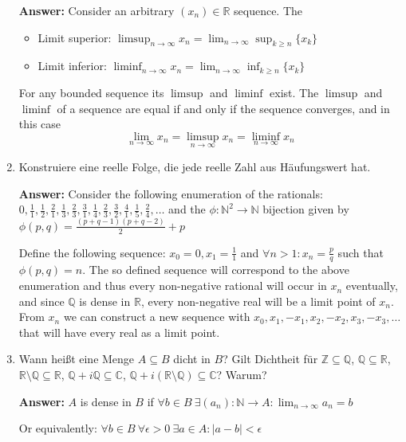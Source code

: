 \documentclass[11pt]{article}
\newcommand{\abs}[1]{\left|#1\right|}
\newcommand{\RR}[0]{\mathbb{R}}
\newcommand{\CC}[0]{\mathbb{C}}
\newcommand{\QQ}[0]{\mathbb{Q}}
\newcommand{\ZZ}[0]{\mathbb{Z}}
\newcommand{\NN}[0]{\mathbb{N}}
\begin{document}
\begin{enumerate}
    \textbf{Answer:} Consider an arbitrary $(x_n) \in \RR$ sequence. The
    \begin{itemize}
        \item Limit superior: $\limsup_{n\to\infty} x_n = \lim_{n\to\infty} \sup_{k \ge n}  \{x_k\}$
        \item Limit inferior: $\liminf_{n\to\infty} x_n = \lim_{n\to\infty} \inf_{k \ge n}  \{x_k\}$
    \end{itemize}
    For any bounded sequence its $\limsup$ and $\liminf$ exist. The $\limsup$ and $\liminf$ of a sequence are equal if and only if the sequence converges, and in this case $$\lim_{n\to\infty} x_n = \limsup_{n\to\infty} x_n = \liminf_{n\to\infty} x_n$$

    \item Konstruiere eine reelle Folge, die jede reelle Zahl aus Häufungswert hat.
    
    \textbf{Answer:} Consider the following enumeration of the rationals: $0, \frac{1}{1}, \frac{1}{2}, \frac{2}{1}, \frac{1}{3}, \frac{2}{3}, \frac{3}{1}, \frac{1}{4}, \frac{2}{3}, \frac{3}{2}, \frac{4}{1}, \frac{1}{5}, \frac{2}{4}, \dots$
    and the $\phi\colon \NN^2 \to \NN$ bijection given by $\phi(p, q) = \frac{(p + q -1)(p + q - 2)}{2} + p$
    
    Define the following sequence: $x_0 = 0, x_1 = \frac{1}{1}$ and $\forall n > 1\colon x_n = \frac{p}{q}$ such that $\phi(p, q) = n$. The so defined sequence will correspond to the above enumeration and thus every non-negative rational will occur in $x_n$ eventually, and since $\QQ$ is dense in $\RR$, every non-negative real will be a limit point of $x_n$. From $x_n$ we can construct a new sequence with $x_0, x_1, -x_1, x_2, -x_2, x_3, -x_3, \dots$ that will have every real as a limit point.

    \item Wann heißt eine Menge $A \subseteq B$ dicht in $B$? Gilt Dichtheit für $\ZZ \subseteq \QQ$, $\QQ \subseteq \RR$, $\RR \setminus \QQ \subseteq \RR$, $\QQ + i\QQ \subseteq \CC$, $\QQ + i(\RR\setminus\QQ) \subseteq \CC$? Warum?

    \textbf{Answer:} $A$ is dense in $B$ if $\forall b \in B~\exists (a_n)\colon \NN \to A\colon \lim_{n\to\infty} a_n = b$ 
    
    Or equivalently: $\forall b \in B~\forall \epsilon > 0~\exists a \in A\colon \abs{a -b} < \epsilon$ 
    

\end{enumerate}
\end{document}

